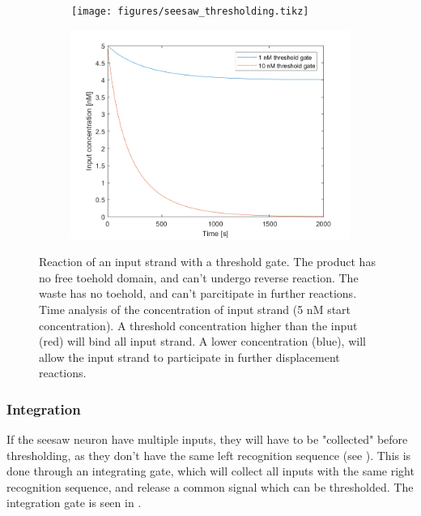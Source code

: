 \begin{figure}[h]
  \begin{subfigure}[t]{.49\textwidth}
    \texttt{[image: figures/seesaw\_thresholding.tikz]}
\caption{}
\label{seesaw_thresholding_reaction}
\end{subfigure}
\hfill
\begin{subfigure}[t]{.49\columnwidth}
  \centering
\includegraphics[width=\linewidth]{images/thresholding}

\caption{}
\label{seesaw_thresholding_analysis}
\end{subfigure}
\caption{ Reaction of an input strand with a threshold gate. The product has no free toehold domain, and can't undergo reverse reaction. The waste has no toehold, and can't parcitipate in further reactions.  Time analysis of the concentration of input strand (5 nM start concentration). A threshold concentration higher than the input (red) will bind all input strand. A lower concentration (blue), will allow the input strand to participate in further displacement reactions.}
\end{figure}

\subsubsection{Integration}
If the seesaw neuron have multiple inputs, they will have to be "collected" before thresholding, as they don't have the same left recognition sequence (see ). This is done through an integrating gate, which will collect all inputs with the same right recognition sequence, and release a common signal which can be thresholded. The integration gate is seen in .

